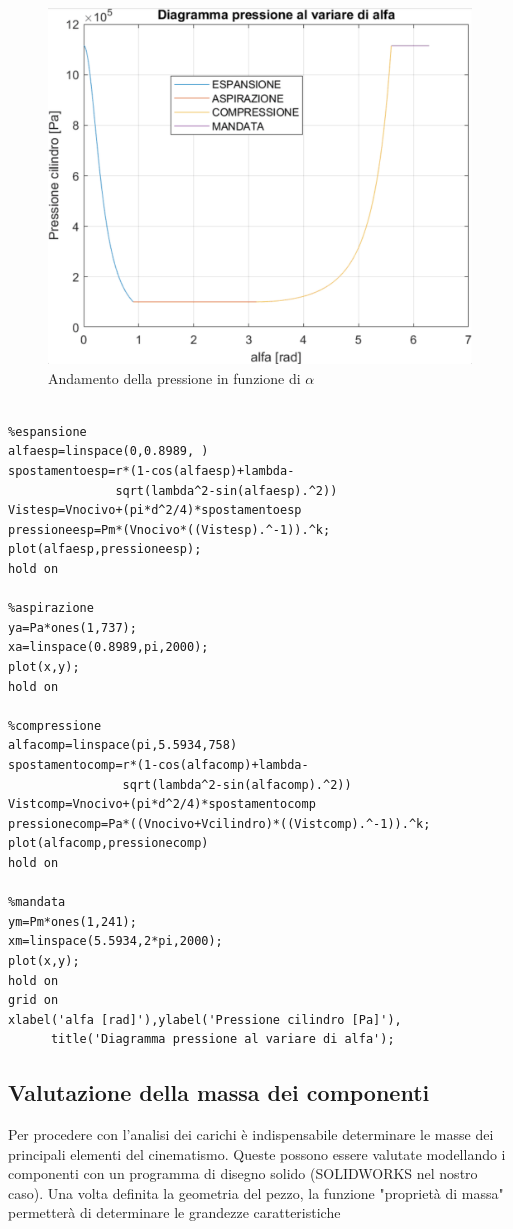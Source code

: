 \begin{figure}[h!]
    \centering
    \includegraphics[scale=0.35]{Immagini/GraficoPressione.png}
    \caption{Andamento della pressione in funzione di $\alpha$}
    \label{fig:GraficoPressione}
\end{figure}
\begin{lstlisting}[frame=trBL]
%grafico pressione al variare di alfa

%espansione
alfaesp=linspace(0,0.8989, )
spostamentoesp=r*(1-cos(alfaesp)+lambda-
               sqrt(lambda^2-sin(alfaesp).^2))
Vistesp=Vnocivo+(pi*d^2/4)*spostamentoesp
pressioneesp=Pm*(Vnocivo*((Vistesp).^-1)).^k;
plot(alfaesp,pressioneesp);
hold on

%aspirazione
ya=Pa*ones(1,737);
xa=linspace(0.8989,pi,2000);
plot(x,y);
hold on

%compressione
alfacomp=linspace(pi,5.5934,758)
spostamentocomp=r*(1-cos(alfacomp)+lambda-
                sqrt(lambda^2-sin(alfacomp).^2))
Vistcomp=Vnocivo+(pi*d^2/4)*spostamentocomp
pressionecomp=Pa*((Vnocivo+Vcilindro)*((Vistcomp).^-1)).^k;
plot(alfacomp,pressionecomp)
hold on

%mandata
ym=Pm*ones(1,241);
xm=linspace(5.5934,2*pi,2000);
plot(x,y);
hold on
grid on
xlabel('alfa [rad]'),ylabel('Pressione cilindro [Pa]'),
      title('Diagramma pressione al variare di alfa');
\end{lstlisting}
\newpage
\subsection{Valutazione della massa dei componenti}
Per procedere con l'analisi dei carichi è indispensabile determinare le masse dei principali elementi del cinematismo. Queste possono essere valutate modellando i componenti con un programma di disegno solido (SOLIDWORKS nel nostro caso).
Una volta definita la geometria del pezzo, la funzione "proprietà di massa" permetterà di determinare le grandezze caratteristiche
